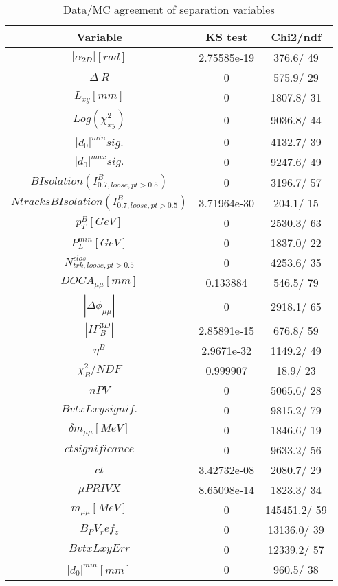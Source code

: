 \documentclass{article}
\begin{document}
\begin{table}[htbp]
\caption{\label{tab:sepVars}Data/MC agreement of separation variables}
\begin{center}
\begin{tabular}{c|c|c}
Variable & KS test & Chi2/ndf \\
\hline
$|\alpha_{2D}| [rad]$ & 2.75585e-19 & 376.6/ 49\\
\hline
$\Delta~R$ & 0 & 575.9/ 29\\
\hline
$L_{xy} [mm]$ & 0 & 1807.8/ 31\\
\hline
$Log(\chi^{2}_{xy})$ & 0 & 9036.8/ 44\\
\hline
$|d_{0}|^{min} sig.$ & 0 & 4132.7/ 39\\
\hline
$|d_{0}|^{max} sig.$ & 0 & 9247.6/ 49\\
\hline
$B Isolation (I^{B}_{0.7, loose, pt>0.5})$ & 0 & 3196.7/ 57\\
\hline
$Ntracks B Isolation (I^{B}_{0.7, loose, pt>0.5})$ & 3.71964e-30 & 204.1/ 15\\
\hline
$p_{T}^{B} [GeV]$ & 0 & 2530.3/ 63\\
\hline
$P^{min}_{L} [GeV]$ & 0 & 1837.0/ 22\\
\hline
$N^{clos}_{trk, loose, pt>0.5}$ & 0 & 4253.6/ 35\\
\hline
$DOCA_{\mu\mu} [mm]$ & 0.133884 & 546.5/ 79\\
\hline
$|\Delta\phi_{\mu\mu}|$ & 0 & 2918.1/ 65\\
\hline
$|IP_{B}^{3D}|$ & 2.85891e-15 & 676.8/ 59\\
\hline
$\eta^{B}$ & 2.9671e-32 & 1149.2/ 49\\
\hline
$\chi^{2}_{B}/NDF$ & 0.999907 &  18.9/ 23\\
\hline
$nPV$ & 0 & 5065.6/ 28\\
\hline
$BvtxLxy signif.$ & 0 & 9815.2/ 79\\
\hline
$\delta m_{\mu\mu} [MeV]$ & 0 & 1846.6/ 19\\
\hline
$ct significance$ & 0 & 9633.2/ 56\\
\hline
$ct$ & 3.42732e-08 & 2080.7/ 29\\
\hline
$\mu PRIVX$ & 8.65098e-14 & 1823.3/ 34\\
\hline
$m_{\mu\mu} [MeV]$ & 0 & 145451.2/ 59\\
\hline
$B_PV_ref_z$ & 0 & 13136.0/ 39\\
\hline
$BvtxLxyErr$ & 0 & 12339.2/ 57\\
\hline
$|d_{0}|^{min} [mm]$ & 0 & 960.5/ 38\\

\end{tabular}
\end{center}
\end{table}
\end{document}

